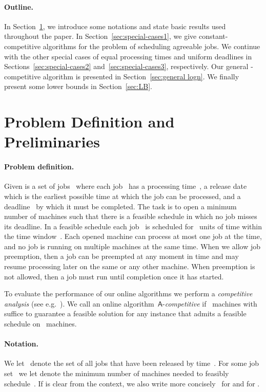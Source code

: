 \documentclass[letterpaper,11pt]{article}
\newcommand{\A}{\ensuremath{\mathsf{A}}\xspace}
\begin{document}
\paragraph{Outline.} In Section~\ref{mp-sec:prelim}, we introduce some notations and state basic results used throughout the paper. In Section~\ref{sec:special-cases1}, we give constant-competitive algorithms for the problem of scheduling agreeable jobs. We continue with the other special cases of equal processing times and uniform deadlines in Sections~\ref{sec:special-cases2} and~\ref{sec:special-cases3}, respectively. Our general -competitive
algorithm is presented in Section~\ref{sec:general logn}. We finally present some lower bounds in Section~\ref{sec:LB}.

\section{Problem Definition and Preliminaries}
\label{mp-sec:prelim}

\paragraph{Problem definition.} Given is a set
of jobs~ where each job~ has a processing
time~, a release
date~ which is the earliest possible time at which the job can be
processed, and a deadline~ by which it must be
completed. The task is to open a minimum number of machines such that
there is a feasible schedule in which no job misses its deadline. In a
feasible schedule each job~ is scheduled for~ units of
time within the time window~. Each opened machine can process at most one job at
the time, and no job is running on multiple machines at the same
time. When we allow job preemption, then a job can be preempted at any
moment in time and may resume processing later on the same or any
other machine. When preemption is not allowed, then a job must run
until completion once it has started. 

To evaluate the performance of our online algorithms we perform a {\em
  competitive analysis} (see e.g.~\cite{borodinEY98}). We call an
online algorithm~\A  -{\em competitive} if~ machines with~ suffice to
guarantee a feasible solution for any instance that admits a
feasible schedule on~ machines.

\paragraph{Notation.} We let~ denote the set of all jobs that have been released by time~. For some job set~ we let  denote the minimum number of machines needed to feasibly schedule~. If  is clear from the context, we also write more concisely~ for  and  for . 
\end{document}
